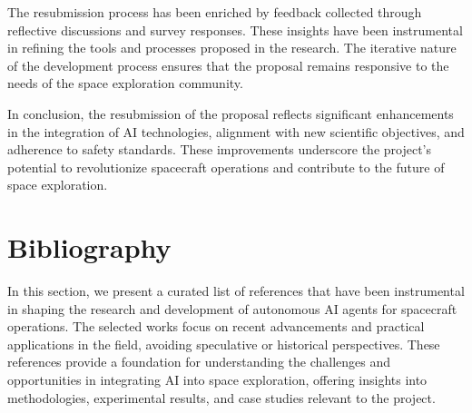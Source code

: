 \documentclass[a4paper, 11pt]{article}
\begin{document}
The resubmission process has been enriched by feedback collected through reflective discussions and survey responses. These insights have been instrumental in refining the tools and processes proposed in the research. The iterative nature of the development process ensures that the proposal remains responsive to the needs of the space exploration community.

In conclusion, the resubmission of the proposal reflects significant enhancements in the integration of AI technologies, alignment with new scientific objectives, and adherence to safety standards. These improvements underscore the project's potential to revolutionize spacecraft operations and contribute to the future of space exploration.
\section{Bibliography}

In this section, we present a curated list of references that have been instrumental in shaping the research and development of autonomous AI agents for spacecraft operations. The selected works focus on recent advancements and practical applications in the field, avoiding speculative or historical perspectives. These references provide a foundation for understanding the challenges and opportunities in integrating AI into space exploration, offering insights into methodologies, experimental results, and case studies relevant to the project.
\end{document}

